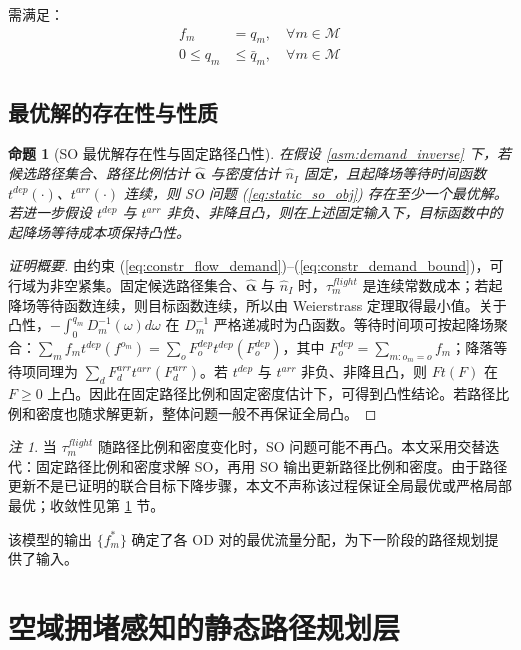 \documentclass[a4paper,12pt]{article}
\theoremstyle{plain}
\newtheorem{proposition}[theorem]{命题}
\theoremstyle{definition}
\theoremstyle{remark}
\newtheorem{remark}[theorem]{注}
\begin{document}
需满足：
\begin{align}
    f_m &= q_m, \quad \forall m \in \mathcal{M} \label{eq:constr_flow_demand}\\
    0 \le q_m &\le \bar{q}_m, \quad \forall m \in \mathcal{M} \label{eq:constr_demand_bound}
\end{align}

\subsection{最优解的存在性与性质}

\begin{proposition}[SO 最优解存在性与固定路径凸性]\label{prop:so_convexity}
在假设 \ref{asm:demand_inverse} 下，若候选路径集合、路径比例估计 $\widehat{\bm\alpha}$ 与密度估计 $\hat n_I$ 固定，且起降场等待时间函数 $t^{dep}(\cdot)$、$t^{arr}(\cdot)$ 连续，则 SO 问题 (\ref{eq:static_so_obj}) 存在至少一个最优解。若进一步假设 $t^{dep}$ 与 $t^{arr}$ 非负、非降且凸，则在上述固定输入下，目标函数中的起降场等待成本项保持凸性。
\end{proposition}

\begin{proof}[证明概要]
由约束 (\ref{eq:constr_flow_demand})--(\ref{eq:constr_demand_bound})，可行域为非空紧集。固定候选路径集合、$\widehat{\bm\alpha}$ 与 $\hat n_I$ 时，$\tau_m^{flight}$ 是连续常数成本；若起降场等待函数连续，则目标函数连续，所以由 Weierstrass 定理取得最小值。关于凸性，$-\int_0^{q_m}D_m^{-1}(\omega)d\omega$ 在 $D_m^{-1}$ 严格递减时为凸函数。等待时间项可按起降场聚合：$\sum_m f_m t^{dep}(f^{o_m})=\sum_o F_o^{dep}t^{dep}(F_o^{dep})$，其中 $F_o^{dep}=\sum_{m:o_m=o}f_m$；降落等待项同理为 $\sum_d F_d^{arr} t^{arr}(F_d^{arr})$。若 $t^{dep}$ 与 $t^{arr}$ 非负、非降且凸，则 $F t(F)$ 在 $F\ge0$ 上凸。因此在固定路径比例和固定密度估计下，可得到凸性结论。若路径比例和密度也随求解更新，整体问题一般不再保证全局凸。
\end{proof}

\begin{remark}
当 $\tau_m^{flight}$ 随路径比例和密度变化时，SO 问题可能不再凸。本文采用交替迭代：固定路径比例和密度求解 SO，再用 SO 输出更新路径比例和密度。由于路径更新不是已证明的联合目标下降步骤，本文不声称该过程保证全局最优或严格局部最优；收敛性见第 \ref{sec:path_planning} 节。
\end{remark}

该模型的输出 $\{f_m^*\}$ 确定了各 OD 对的最优流量分配，为下一阶段的路径规划提供了输入。

\section{空域拥堵感知的静态路径规划层}\label{sec:path_planning}
\end{document}
